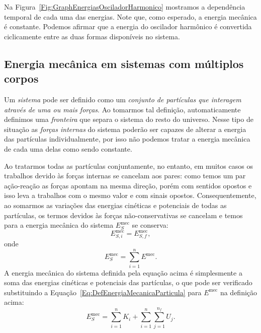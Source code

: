 Na Figura~\ref{Fig:GraphEnergiasOsciladorHarmonico} mostramos a dependência temporal de cada uma das energias. Note que, como esperado, a energia mecânica é constante. Podemos afirmar que a energia do oscilador harmônico é convertida ciclicamente entre as duas formas disponíveis no sistema.



\subsection{Energia mecânica em sistemas com múltiplos corpos}
\label{Sec:Sistemas}

Um \emph{sistema} pode ser definido como um \emph{conjunto de partículas que interagem através de uma ou mais forças}. Ao tomarmos tal definição, automaticamente definimos uma \emph{fronteira} que separa o sistema do resto do universo. Nesse tipo de situação as \emph{forças internas} do sistema poderão ser capazes de alterar a energia das partículas individualmente, por isso não podemos tratar a energia mecânica de cada uma delas como sendo constante.

Ao tratarmos todas as partículas conjuntamente, no entanto, em muitos casos os trabalhos devido às forças internas se cancelam aos pares: como temos um par ação-reação as forças apontam na mesma direção, porém com sentidos opostos e isso leva a trabalhos com o mesmo valor e com sinais opostos. Consequentemente, ao somarmos as variações das energias cinéticas e potenciais de todas as partículas, os termos devidos às forças não-conservativas se cancelam e temos para a energia mecânica do sistema $E_S^{\text{mec}}$ se conserva:
\begin{equation}
    E_{S,i}^{\text{mec}} = E_{S,f}^{\text{mec}},
\end{equation}
%
onde
\begin{equation}
    E_S^{\text{mec}} = \sum_{i = 1}^{n} E^{\text{mec}}.
\end{equation}
%
A energia mecânica do sistema definida pela equação acima é simplesmente a soma das energias cinéticas e potenciais das partículas, o que pode ser verificado substituindo a Equação~\ref{Eq:DefEnergiaMecanicaParticula} para $E^{\text{mec}}$ na definição acima:
\begin{equation}
    E_S^{\text{mec}} = \sum_{i = 1}^{n} K_i + \sum_{i = 1}^n \sum_{j = 1}^{n_f} U_j.
\end{equation}

